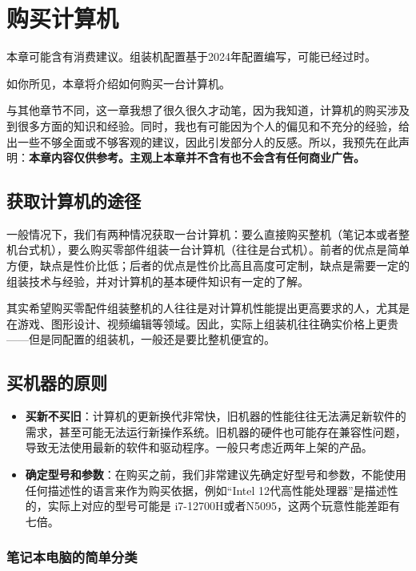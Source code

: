 \documentclass[../main.tex]{subfiles}
\begin{document}
\chapter{购买计算机}

\begin{flushright}
  {\kaishu 本章可能含有消费建议。组装机配置基于2024年配置编写，可能已经过时。}
\end{flushright}

如你所见，本章将介绍如何购买一台计算机。

与其他章节不同，这一章我想了很久很久才动笔，因为我知道，计算机的购买涉及到很多方面的知识和经验。同时，我也有可能因为个人的偏见和不充分的经验，给出一些不够全面或不够客观的建议，因此引发部分人的反感。所以，我预先在此声明：\textbf{本章内容仅供参考。主观上本章并不含有也不会含有任何商业广告。}

\section{获取计算机的途径}

一般情况下，我们有两种情况获取一台计算机：要么直接购买整机（笔记本或者整机台式机），要么购买零部件组装一台计算机（往往是台式机）。前者的优点是简单方便，缺点是性价比低；后者的优点是性价比高且高度可定制，缺点是需要一定的组装技术与经验，并对计算机的基本硬件知识有一定的了解。

其实希望购买零配件组装整机的人往往是对计算机性能提出更高要求的人，尤其是在游戏、图形设计、视频编辑等领域。因此，实际上组装机往往确实价格上更贵——但是同配置的组装机，一般还是要比整机便宜的。

\section{买机器的原则}

\begin{itemize}
  \item \textbf{买新不买旧}：计算机的更新换代非常快，旧机器的性能往往无法满足新软件的需求，甚至可能无法运行新操作系统。旧机器的硬件也可能存在兼容性问题，导致无法使用最新的软件和驱动程序。一般只考虑近两年上架的产品。
  \item \textbf{确定型号和参数}：在购买之前，我们非常建议先确定好型号和参数，不能使用任何描述性的语言来作为购买依据，例如“Intel 12代高性能处理器”是描述性的，实际上对应的型号可能是 i7-12700H或者N5095，这两个玩意性能差距有七倍。
\end{itemize}

\subsection{笔记本电脑的简单分类}
\end{document}

